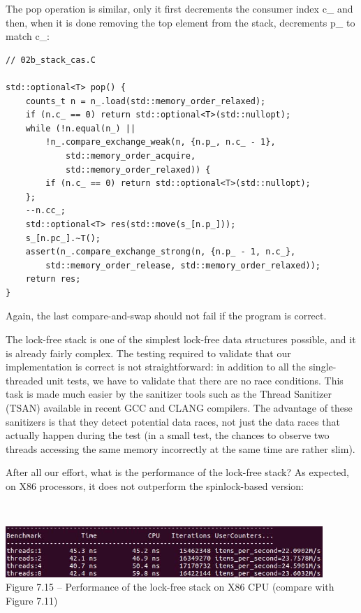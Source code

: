 The pop operation is similar, only it first decrements the consumer index c\_ and then, when it is done removing the top element from the stack, decrements p\_ to match c\_:

\begin{lstlisting}[style=styleCXX]
// 02b_stack_cas.C
	
std::optional<T> pop() {
	counts_t n = n_.load(std::memory_order_relaxed);
	if (n.c_ == 0) return std::optional<T>(std::nullopt);
	while (!n.equal(n_) ||
		!n_.compare_exchange_weak(n, {n.p_, n.c_ - 1},
			std::memory_order_acquire,
			std::memory_order_relaxed)) {
		if (n.c_ == 0) return std::optional<T>(std::nullopt);
	};
	--n.cc_;
	std::optional<T> res(std::move(s_[n.p_]));
	s_[n.pc_].~T();
	assert(n_.compare_exchange_strong(n, {n.p_ - 1, n.c_},
		std::memory_order_release, std::memory_order_relaxed));
	return res;
}
\end{lstlisting}

Again, the last compare-and-swap should not fail if the program is correct.

The lock-free stack is one of the simplest lock-free data structures possible, and it is already fairly complex. The testing required to validate that our implementation is correct is not straightforward: in addition to all the single-threaded unit tests, we have to validate that there are no race conditions. This task is made much easier by the sanitizer tools such as the Thread Sanitizer (TSAN) available in recent GCC and CLANG compilers. The advantage of these sanitizers is that they detect potential data races, not just the data races that actually happen during the test (in a small test, the chances to observe two threads accessing the same memory incorrectly at the same time are rather slim).

After all our effort, what is the performance of the lock-free stack? As expected, on X86 processors, it does not outperform the spinlock-based version:

\hspace*{\fill} \\ %
\begin{center}
\includegraphics[width=0.9\textwidth]{content/2/chapter7/images/15.jpg}\\ 
Figure 7.15 – Performance of the lock-free stack on X86 CPU (compare with Figure 7.11)
\end{center}

